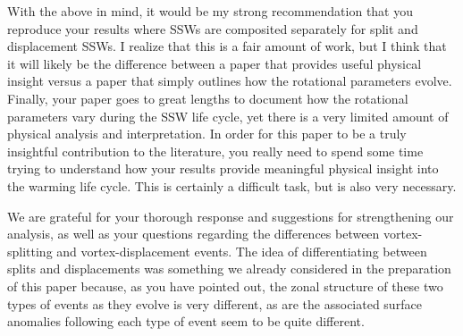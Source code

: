 \documentclass[a4paper,10pt]{article}
\begin{document}
\textcolor{reviewer}{With the above in mind, it would be my strong recommendation that you reproduce your
results where SSWs are composited separately for split and displacement SSWs. I realize
that this is a fair amount of work, but I think that it will likely be the difference between a
paper that provides useful physical insight versus a paper that simply outlines how the
rotational parameters evolve.
Finally, your paper goes to great lengths to document how the rotational parameters vary
during the SSW life cycle, yet there is a very limited amount of physical analysis and
interpretation. In order for this paper to be a truly insightful contribution to the literature,
you really need to spend some time trying to understand how your results provide
meaningful physical insight into the warming life cycle. This is certainly a difficult task,
but is also very necessary.}


\vspace{0.5cm}

We are grateful for your thorough response and suggestions for strengthening our analysis, as well as your questions regarding the differences between vortex-splitting and vortex-displacement events.  
The idea of differentiating between splits and displacements was something we already considered in the preparation of this paper because, as you have pointed out, the zonal structure of these two types of events as they evolve is very different, as are the associated surface anomalies following each type of event seem to be quite different.
\end{document}
